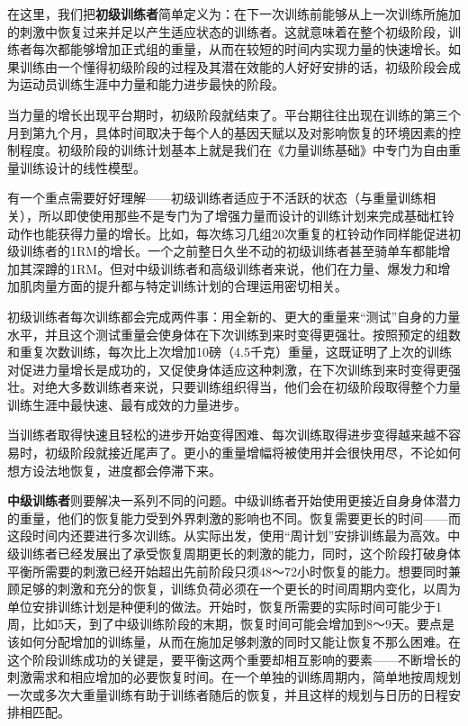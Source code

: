 在这里，我们把\textbf{初级训练者}简单定义为：在下一次训练前能够从上一次训练所施加的刺激中恢复过来并足以产生适应状态的训练者。这就意味着在整个初级阶段，训练者每次都能够增加正式组的重量，从而在较短的时间内实现力量的快速增长。如果训练由一个懂得初级阶段的过程及其潜在效能的人好好安排的话，初级阶段会成为运动员训练生涯中力量和能力进步最快的阶段。

当力量的增长出现平台期时，初级阶段就结束了。平台期往往出现在训练的第三个月到第九个月，具体时间取决于每个人的基因天赋以及对影响恢复的环境因素的控制程度。初级阶段的训练计划基本上就是我们在《力量训练基础》中专门为自由重量训练设计的线性模型。

有一个重点需要好好理解——初级训练者适应于不活跃的状态（与重量训练相关），所以即使使用那些不是专门为了增强力量而设计的训练计划来完成基础杠铃动作也能获得力量的增长。比如，每次练习几组20次重复的杠铃动作同样能促进初级训练者的1RM的增长。一个之前整日久坐不动的初级训练者甚至骑单车都能增加其深蹲的1RM。但对中级训练者和高级训练者来说，他们在力量、爆发力和增加肌肉量方面的提升都与特定训练计划的合理运用密切相关。

初级训练者每次训练都会完成两件事：用全新的、更大的重量来“测试”自身的力量水平，并且这个测试重量会使身体在下次训练到来时变得更强壮。按照预定的组数和重复次数训练，每次比上次增加10磅（4.5千克）重量，这既证明了上次的训练对促进力量增长是成功的，又促使身体适应这种刺激，在下次训练到来时变得更强壮。对绝大多数训练者来说，只要训练组织得当，他们会在初级阶段取得整个力量训练生涯中最快速、最有成效的力量进步。

当训练者取得快速且轻松的进步开始变得困难、每次训练取得进步变得越来越不容易时，初级阶段就接近尾声了。更小的重量增幅将被使用并会很快用尽，不论如何想方设法地恢复，进度都会停滞下来。

\textbf{中级训练者}则要解决一系列不同的问题。中级训练者开始使用更接近自身身体潜力的重量，他们的恢复能力受到外界刺激的影响也不同。恢复需要更长的时间——而这段时间内还要进行多次训练。从实际出发，使用“周计划”安排训练最为高效。中级训练者已经发展出了承受恢复周期更长的刺激的能力，同时，这个阶段打破身体平衡所需要的刺激已经开始超出先前阶段只须48～72小时恢复的能力。想要同时兼顾足够的刺激和充分的恢复，训练负荷必须在一个更长的时间周期内变化，以周为单位安排训练计划是种便利的做法。开始时，恢复所需要的实际时间可能少于1周，比如5天，到了中级训练阶段的末期，恢复时间可能会增加到8～9天。要点是该如何分配增加的训练量，从而在施加足够刺激的同时又能让恢复不那么困难。在这个阶段训练成功的关键是，要平衡这两个重要却相互影响的要素——不断增长的刺激需求和相应增加的必要恢复时间。在一个单独的训练周期内，简单地按周规划一次或多次大重量训练有助于训练者随后的恢复，并且这样的规划与日历的日程安排相匹配。

